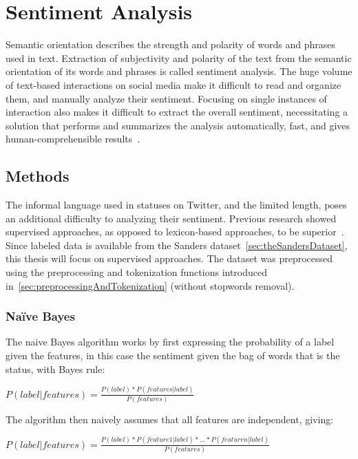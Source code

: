 \chapter{Sentiment Analysis}
\label{ch:sentimentAnalysis}

Semantic orientation describes the strength and polarity of words and phrases used in text.
Extraction of subjectivity and polarity of the text from the semantic orientation of its words and phrases is called sentiment analysis.
The huge volume of text-based interactions on social media make it difficult
to read and organize them, and manually analyze their sentiment.
Focusing on single instances of interaction also makes it difficult to extract the overall sentiment,
necessitating a solution that performs and summarizes the analysis automatically, fast, and gives human-comprehensible results~\cite{Sarlan2014}.

\section{Methods}
\label{sec:methods}

The informal language used in statuses on Twitter, and the limited length, poses an additional difficulty
to analyzing their sentiment.
Previous research showed supervised approaches, as opposed to lexicon-based approaches, to be superior~\cite{Sarlan2014}.
Since labeled data is available from the Sanders dataset~\ref{sec:theSandersDataset},
this thesis will focus on supervised approaches.
The dataset was preprocessed using the preprocessing and tokenization functions introduced in~\ref{sec:preprocessingAndTokenization} (without stopwords removal).

\subsection{Na\"{i}ve Bayes}
\label{subsec:naivebayes}

The naive Bayes algorithm works by first expressing the probability of a label given the features,
in this case the sentiment given the bag of words that is the status, with Bayes rule:

\begin{math}
    P(label|features) = \frac{P(label)*P(features|label)}{P(features)}
\end{math}

The algorithm then naively assumes that all features are independent, giving:

\begin{math}
    P(label|features) = \frac{P(label)*P(feature 1|label)*...*P(feature n|label)}{P(features)}
\end{math}


